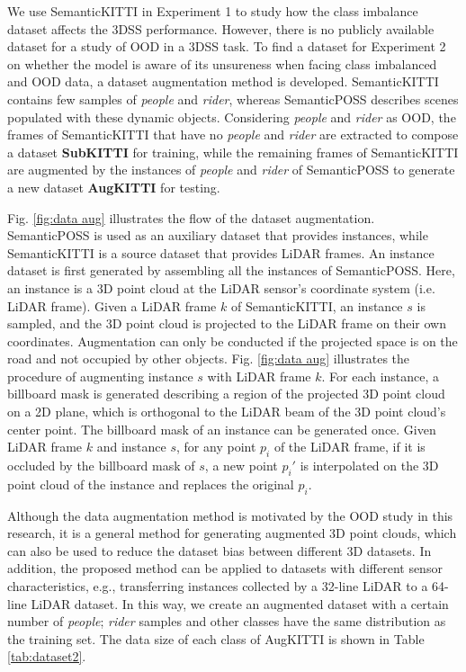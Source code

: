 \documentclass[journal]{IEEEtran}
\begin{document}
We use SemanticKITTI in Experiment 1 to study how the class imbalance dataset affects the 3DSS performance. However, there is no publicly available dataset for a study of OOD in a 3DSS task.
To find a dataset for Experiment 2 on whether the model is aware of its unsureness when facing class imbalanced and OOD data, a dataset augmentation method is developed. SemanticKITTI contains few samples of \textit{people} and \textit{rider}, whereas SemanticPOSS describes scenes populated with these dynamic objects. Considering \textit{people} and \textit{rider} as OOD, the frames of SemanticKITTI that have no \textit{people} and \textit{rider} are extracted to compose a dataset \textbf{SubKITTI} for training, while the remaining frames of SemanticKITTI are augmented by the instances of \textit{people} and \textit{rider} of SemanticPOSS to generate a new dataset \textbf{AugKITTI} for testing.

Fig. \ref{fig:data aug} illustrates the flow of the dataset augmentation. SemanticPOSS is used as an auxiliary dataset that provides instances, while SemanticKITTI is a source dataset that provides LiDAR frames. An instance dataset is first generated by assembling all the instances of SemanticPOSS. Here, an instance is a 3D point cloud at the LiDAR sensor's coordinate system (i.e. LiDAR frame). Given a LiDAR frame $k$ of SemanticKITTI, an instance $s$ is sampled, and the 3D point cloud is projected to the LiDAR frame on their own coordinates. Augmentation can only be conducted if the projected space is on the road and not occupied by other objects. Fig. \ref{fig:data aug} illustrates the procedure of augmenting instance $s$ with LiDAR frame $k$. For each instance, a billboard mask is generated describing a region of the projected 3D point cloud on a 2D plane, which is orthogonal to the LiDAR beam of the 3D point cloud's center point. The billboard mask of an instance can be generated once. Given LiDAR frame $k$ and instance $s$, for any point $p_i$ of the LiDAR frame, if it is occluded by the billboard mask of $s$, a new point $p_i'$ is interpolated on the 3D point cloud of the instance and replaces the original $p_i$.

Although the data augmentation method is motivated by the OOD study in this research, it is a general method for generating augmented 3D point clouds, which can also be used to reduce the dataset bias between different 3D datasets. In addition, the proposed method can be applied to datasets with different sensor characteristics, e.g., transferring instances collected by a 32-line LiDAR to a 64-line LiDAR dataset. In this way, we create an augmented dataset with a certain number of \textit{people}; \textit{rider} samples and other classes have the same distribution as the training set. The data size of each class of AugKITTI is shown in Table \ref{tab:dataset2}.
\end{document}
